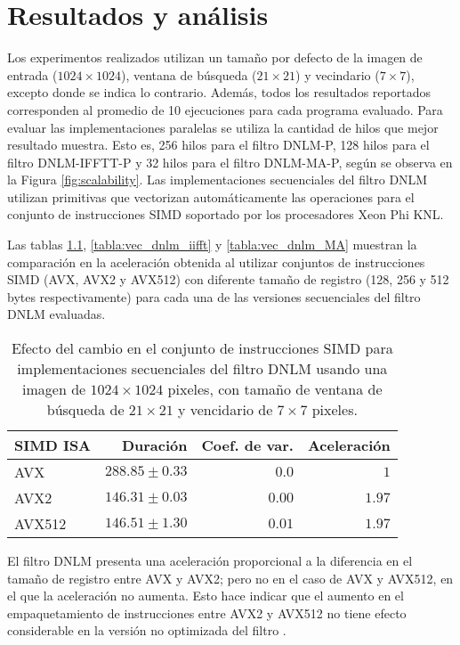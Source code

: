 \chapter{Resultados y análisis}
\label{ch:res}

Los experimentos realizados utilizan un tama\~no por defecto de la imagen de entrada ($1024 \times 1024$), ventana de b\'usqueda \Omega  ($21 \times 21$) y vecindario \omega ($7 \times 7$), excepto donde se indica lo contrario. Adem\'as, todos los resultados reportados corresponden al promedio de 10 ejecuciones para cada programa evaluado.  Para evaluar las implementaciones paralelas se utiliza la cantidad de hilos que mejor resultado muestra. Esto es, 256 hilos para el filtro DNLM-P, 128 hilos para el filtro DNLM-IFFTT-P y 32 hilos para el filtro DNLM-MA-P, seg\'un se observa en la Figura \ref{fig:scalability}. Las implementaciones secuenciales del filtro DNLM utilizan primitivas que vectorizan autom\'aticamente las operaciones para el conjunto de instrucciones SIMD soportado por los procesadores Xeon Phi KNL.

Las tablas \ref{tabla:vec_dnlm}, \ref{tabla:vec_dnlm_iifft} y \ref{tabla:vec_dnlm_MA} muestran la comparaci\'on en la aceleraci\'on obtenida al utilizar conjuntos de instrucciones SIMD (AVX, AVX2 y AVX512) con diferente tama\~no de registro (128, 256 y 512 bytes respectivamente) para cada una de las versiones secuenciales del filtro DNLM evaluadas. 


\begin{table}
\protect\caption[Efecto de vectorizaci\'on con instrucciones SIMD para el filtro DNLM]{Efecto del cambio en el conjunto de instrucciones SIMD para implementaciones secuenciales del filtro DNLM usando una imagen de  $1024 \times 1024$ pixeles, con tama\~no de ventana de b\'usqueda de $21 \times 21$ y vencidario de $7 \times 7$ pixeles. \label{tabla:vec_dnlm}}
\centering
\begin{tabular}{lrrr}
SIMD ISA & Duraci\'on \left[s\right]& Coef. de var. & Aceleraci\'on \left[x\right] \tabularnewline
\hline
AVX & $288.85\pm0.33$ & $0.0$ & $1$\tabularnewline
AVX2 & $146.31\pm0.03$ & $0.00$ & $1.97$\tabularnewline
AVX512 & $146.51\pm 1.30$ & $0.01$ & $1.97$ \tabularnewline
\end{tabular}
\end{table}

El filtro DNLM presenta una aceleraci\'on proporcional a la diferencia en el tama\~no de registro entre AVX y AVX2; pero no en el caso de AVX y AVX512, en el que la aceleraci\'on no aumenta. Esto hace indicar que el aumento en el empaquetamiento de instrucciones entre AVX2 y AVX512 no tiene efecto considerable en la versi\'on no optimizada del filtro . 



